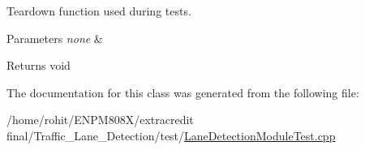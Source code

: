 Teardown function used during tests. 


\begin{DoxyParams}{Parameters}
{\em none} & \\
\hline
\end{DoxyParams}
\begin{DoxyReturn}{Returns}
void 
\end{DoxyReturn}


The documentation for this class was generated from the following file\+:\begin{DoxyCompactItemize}
\item 
/home/rohit/\+E\+N\+P\+M808\+X/extracredit final/\+Traffic\+\_\+\+Lane\+\_\+\+Detection/test/\hyperlink{LaneDetectionModuleTest_8cpp}{Lane\+Detection\+Module\+Test.\+cpp}\end{DoxyCompactItemize}
